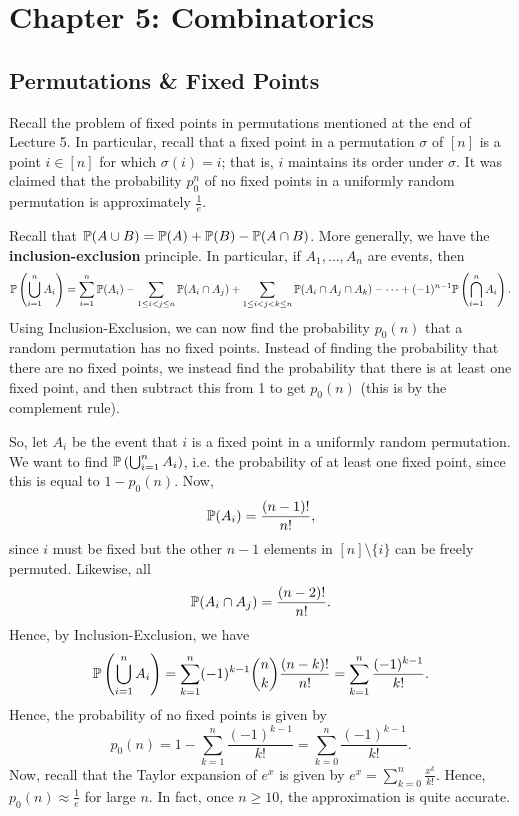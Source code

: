 \documentclass[letterpaper]{article}
\begin{document}
\section{Chapter 5: Combinatorics}
\subsection{Permutations \& Fixed Points}
Recall the problem of fixed points in permutations mentioned at the end of Lecture 5. In particular, recall that a fixed point in a permutation $\sigma$ of $[n]$ is a point $i \in [n]$ for which $\sigma(i) = i$; that is, $i$ maintains its order under $\sigma$. It was claimed that the probability $p_{0}^n$ of no fixed points in a uniformly random permutation is approximately $\frac{1}{e}$. 

\bigskip 

Recall that $\mathbb{P}(A \cup B) = \mathbb{P}(A) + \mathbb{P}(B) - \mathbb{P}(A \cap B)$. More generally, we have the \textbf{inclusion-exclusion} principle. In particular, if $A_1, \dots, A_n$ are events, then 
\[\mathbb{P}\left(\bigcup_{i = 1}^{n} A_i\right) = \sum_{i = 1}^{n} \mathbb{P}(A_i) - \sum_{1 \leq i < j \leq n} \mathbb{P}(A_i \cap A_j) + \sum_{1 \leq i < j < k \leq n} \mathbb{P}(A_i \cap A_j \cap A_k) - \dots + (-1)^{n - 1} \mathbb{P}\left(\bigcap_{i = 1}^{n} A_i\right).\]
Using Inclusion-Exclusion, we can now find the probability $p_0(n)$ that a random permutation has no fixed points. Instead of finding the probability that there are no fixed points, we instead find the probability that there is at least one fixed point, and then subtract this from 1 to get $p_0(n)$ (this is by the complement rule).

\bigskip 

So, let $A_i$ be the event that $i$ is a fixed point in a uniformly random permutation. We want to find $\mathbb{P}\left(\bigcup_{i = 1}^{n} A_i\right)$, i.e. the probability of at least one fixed point, since this is equal to $1 - p_0(n)$. Now, 
\[\mathbb{P}(A_i) = \frac{(n - 1)!}{n!},\]
since $i$ must be fixed but the other $n - 1$ elements in $[n] \setminus \{i\}$ can be freely permuted. Likewise, all 
\[\mathbb{P}(A_i \cap A_j) = \frac{(n - 2)!}{n!}.\]
Hence, by Inclusion-Exclusion, we have 
\[\mathbb{P}\left(\bigcup_{i = 1}^{n} A_i\right) = \sum_{k = 1}^{n} (-1)^{k - 1} \binom{n}{k} \frac{(n - k)!}{n!} = \sum_{k = 1}^{n} \frac{(-1)^{k - 1}}{k!}.\]
Hence, the probability of no fixed points is given by 
\[p_0(n) = 1 - \sum_{k = 1}^{n} \frac{(-1)^{k - 1}}{k!} = \sum_{k = 0}^{n} \frac{(-1)^{k - 1}}{k!}.\]
Now, recall that the Taylor expansion of $e^x$ is given by $e^x = \sum_{k = 0}^{n} \frac{x^k}{k!}$. Hence, $p_0(n) \approx \frac{1}{e}$ for large $n$. In fact, once $n \geq 10$, the approximation is quite accurate. 
\end{document}
